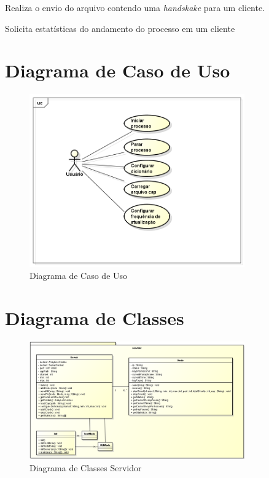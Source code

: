 \documentclass[12pt,a4paper]{abnt}
\begin{document}
		{Realiza o envio do arquivo contendo uma \emph{handskake} para um cliente.}
		{
		}

		{Solicita estatísticas do andamento do processo em um cliente}
		{
		}

		\clearpage
		\section{Diagrama de Caso de Uso}

		\begin{figure}[htp]
			\begin{center}
			  \includegraphics[width=350px]{casoDeUso}
			  \caption{Diagrama de Caso de Uso}
			  \label{fig:casoDeUso}
			\end{center}
		\end{figure}
		\FloatBarrier

		\clearpage
		\section{Diagrama de Classes}

			\begin{figure}[htp]
				\begin{center}
				  \includegraphics[width=350px]{diagramaClassesServidor}
				  \caption{Diagrama de Classes Servidor}
				  \label{fig:diagramaClassesServidor}
				\end{center}
			\end{figure}
\end{document}
